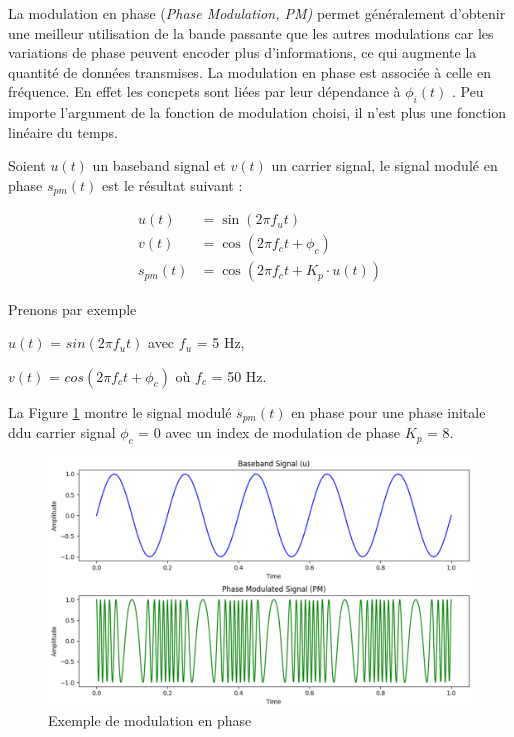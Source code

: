 La modulation en phase (\textit{Phase Modulation, PM)} permet généralement d'obtenir une meilleur utilisation de la bande passante que les autres modulations car les variations de phase peuvent encoder plus d'informations, ce qui augmente la quantité de données transmises. La modulation en phase est associée à celle en fréquence. En effet les concpets sont liées par leur dépendance à $\phi_i(t)$ . Peu importe l'argument de la fonction de modulation choisi, il n'est plus une fonction linéaire du temps.

Soient $u(t)$ un baseband signal et $v(t)$ un carrier signal, le signal modulé en phase $s_{pm}(t)$ est le résultat suivant :

\begin{align}
    u(t) &= \sin(2\pi f_{u}t) \\
    v(t) &= \cos(2\pi f_{c}t + \phi_{c}) \\
    s_{pm}(t) &= \cos\left(2\pi f_{c}t + K_{p} \cdot u(t)\right)
\end{align}

\vspace{0.1cm}

Prenons par exemple

\vspace{0.1cm}

$u(t)$ = $sin(2\pi f_{u}t)$ avec $f_{u}$ = 5 Hz,

$v(t)$ = $cos(2\pi f_{c}t + \phi_{c})$ où $f_{c}$ = 50 Hz.

\vspace{0.1cm}

La Figure \ref{term3} montre le signal modulé $s_{pm}(t)$ en phase pour une phase initale ddu carrier signal $\phi_{c}$ = 0 avec un index de modulation de phase $K_{p}$ = 8.


\begin{figure}[h]
\centering

\includegraphics[scale=0.5]{images/PM_mod.PNG}
\caption{Exemple de modulation en phase}\label{term3}
\end{figure}

